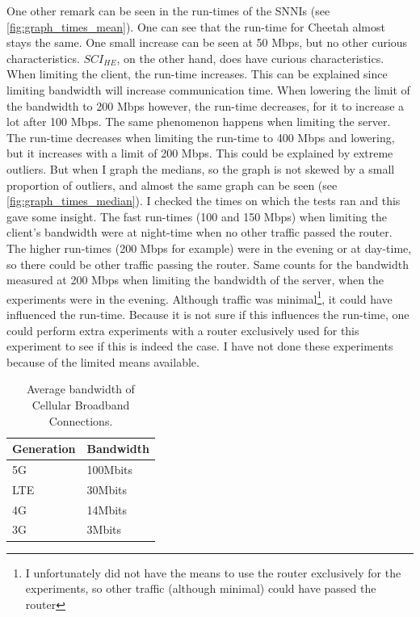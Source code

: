 \documentclass[../thesis.tex]{subfiles}
\begin{document}
One other remark can be seen in the run-times of the SNNIs (see \autoref{fig:graph_times_mean}). One can see that the run-time for Cheetah almost stays the same. One small increase can be seen at 50 Mbps, but no other curious characteristics. $SCI_{HE}$, on the other hand, does have curious characteristics. When limiting the client, the run-time increases. This can be explained since limiting bandwidth will increase communication time. When lowering the limit of the bandwidth to 200 Mbps however, the run-time decreases, for it to increase a lot after 100 Mbps. The same phenomenon happens when limiting the server. The run-time decreases when limiting the run-time to 400 Mbps and lowering, but it increases with a limit of 200 Mbps. This could be explained by extreme outliers. But when I graph the medians, so the graph is not skewed by a small proportion of outliers, and almost the same graph can be seen (see \autoref{fig:graph_times_median}). I checked the times on which the tests ran and this gave some insight. The fast run-times (100 and 150 Mbps) when limiting the client's bandwidth were at night-time when no other traffic passed the router. The higher run-times (200 Mbps for example) were in the evening or at day-time, so there could be other traffic passing the router. Same counts for the bandwidth measured at 200 Mbps when limiting the bandwidth of the server, when the experiments were in the evening. Although traffic was minimal\footnote{I unfortunately did not have the means to use the router exclusively for the experiments, so other traffic (although minimal) could have passed the router}, it could have influenced the run-time. Because it is not sure if this influences the run-time, one could perform extra experiments with a router exclusively used for this experiment to see if this is indeed the case. I have not done these experiments because of the limited means available.

\begingroup
    \setlength{\intextsep}{0pt}
    \begin{table}
        \begin{tabular}{ll}
                Generation & Bandwidth \\ \hline
                5G         & 100Mbits  \\ \hline
                LTE        & 30Mbits   \\ \hline
                4G         & 14Mbits   \\ \hline
                3G         & 3Mbits   
        \end{tabular}
        \caption{Average bandwidth of Cellular Broadband Connections.}
        \label{table:bandwidth}
    \end{table}
\end{document}
